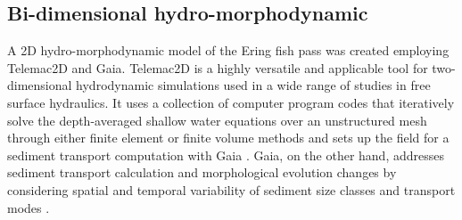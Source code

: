 \documentclass[draft,linenumbers,onecolumn]{agujournal2019} %
\begin{document}
\subsection{Bi-dimensional hydro-morphodynamic}
\label{sec:Sec2.2}

A 2D hydro-morphodynamic model of the Ering fish pass was created employing Telemac2D and Gaia. Telemac2D is a  highly versatile and applicable tool for two-dimensional hydrodynamic simulations used in a wide range of studies in free surface hydraulics. It uses a collection of computer program codes that iteratively solve the depth-averaged shallow water equations over an unstructured mesh through either finite element or finite volume methods and sets up the field for a sediment transport computation with Gaia \cite{galland1991telemac,hervouet2007hydrodynamics,tassi2023gaia}. Gaia, on the other hand, addresses sediment transport calculation and morphological evolution changes by considering spatial and temporal variability of sediment size classes and transport modes \cite{tassi2023gaia}. 

%
%


\end{document}
